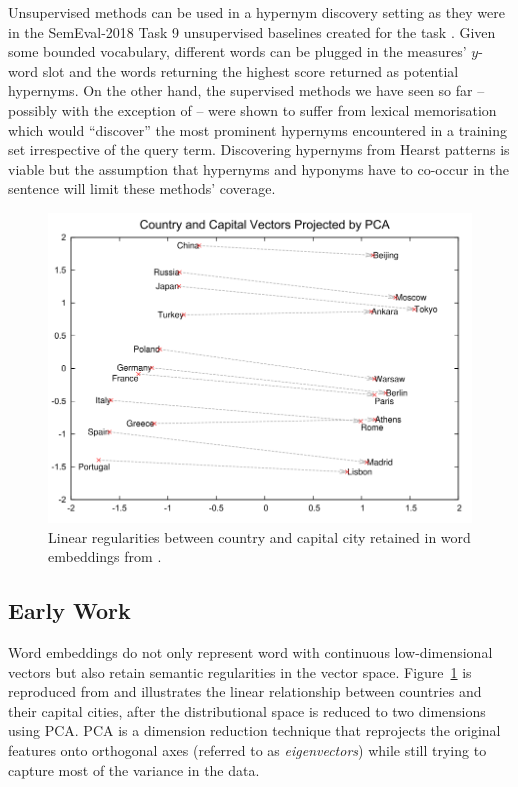Unsupervised methods can be used in a hypernym discovery setting as they were in the SemEval-2018 Task 9 unsupervised baselines created for the task \citep{camacho2018semeval}.  Given some bounded vocabulary, different words can be plugged in the measures’ $y$-word slot and the words returning the highest score returned as potential hypernyms.  On the other hand, the supervised methods we have seen so far – possibly with the exception of \citep{Snow2004} – were shown to suffer from lexical memorisation which would “discover” the most prominent hypernyms encountered in a training set irrespective of the query term.    Discovering hypernyms from Hearst patterns is viable \citep{hearst1992automatic, wu2012probase, Snow2004} but the assumption that hypernyms and hyponyms have to co-occur in the sentence will limit these methods’ coverage.  

\begin{figure}[ht!] 
  \centering
  \includegraphics[width=1.\linewidth]{images/mikolov_semantic_regularity.png}
  \caption{Linear regularities between country and capital city retained in word embeddings from \citep{mikolov2013distributed}.}
  \label{fig:mikolov_capital_cities}
\end{figure}

\subsection{Early Work}
Word embeddings do not only represent word with continuous low-dimensional vectors but also retain semantic regularities in the vector space.  Figure~\ref{fig:mikolov_capital_cities} is reproduced from \citep{mikolov2013distributed} and illustrates the linear relationship between countries and their capital cities, after the distributional space is reduced to two dimensions using \ac{PCA}.  \ac{PCA} is a dimension reduction technique that reprojects the original features onto orthogonal axes (referred to as \textit{eigenvectors}) while still trying to capture most of the variance in the data.

